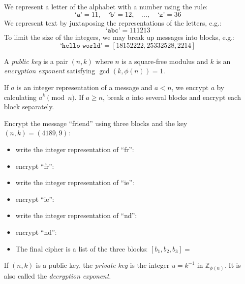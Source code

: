 \documentclass[12pt]{exam}
\newcommand{\Z}{\mathbb Z}
\begin{document}
\begin{questions}
  \question We represent a letter of the alphabet with a number using the rule:
  \[\texttt{`a'}=11,\quad\texttt{`b'}=12,\quad\ldots,\quad\texttt{`z'}=36
  \]
  We represent text by juxtaposing the representations of the letters, e.g.:
  \[\texttt{`abc'}=111213
  \]
  To limit the size of the integers, we may break up messages into blocks, e.g.:
  \[\texttt{`hello world'}=[18152222, 25332528, 2214]
  \]
  \newpage
  \question A \emph{public key} is a pair $(n,k)$ where $n$ is a square-free modulus and $k$ is an \emph{encryption exponent} satisfying $\gcd(k,\phi(n))=1$.

  If $a$ is an integer representation of a message and $a<n$, we encrypt $a$ by calculating $a^k\pmod{n}$. If $a\geq n$, break $a$ into several blocks and encrypt each block separately.
    
  Encrypt the message ``friend'' using three blocks and the key $(n,k)=(4189,9)$:
  \begin{itemize}
    \item write the integer representation of ``fr'':
    \vspace{1cm}
    \item encrypt ``fr'':
    \vspace{1cm}
    \item write the integer representation of ``ie'':
    \vspace{1cm}
    \item encrypt ``ie'':
    \vspace{1cm}
    \item write the integer representation of ``nd'':
    \vspace{1cm}
    \item encrypt ``nd'':
    \vspace{1cm}
    \item The final cipher is a list of the three blocks: $[b_1,b_2,b_3]=$
  \end{itemize}
  \newpage
  \question If $(n,k)$ is a public key, the \emph{private key} is the integer $u=k^{-1}$ in $\Z_{\phi(n)}$. It is also called the \emph{decryption exponent}.
  

\end{questions}
\end{document}
